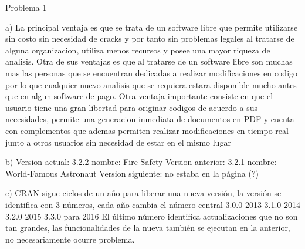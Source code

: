 \documentclass{article}
\begin{document}


Problema 1

a) La principal ventaja es que se trata de un software libre que permite utilizarse sin costo sin necesidad de cracks y por tanto sin problemas legales al tratarse de alguna organizacion, utiliza menos recursos y posee una mayor riqueza de analisis. Otra de sus ventajas es que al tratarse de un software libre son muchas mas las  personas que se encuentran dedicadas a realizar modificaciones en codigo por lo que cualquier nuevo analisis que se requiera estara disponible mucho antes que en algun software de pago. Otra ventaja importante consiste en que el usuario tiene una gran libertad para originar codigos de acuerdo a sus necesidades, permite una generacion inmediata de documentos en PDF y cuenta con complementos que ademas permiten realizar modificaciones en tiempo real junto a otros usuarios sin necesidad de estar en el mismo lugar

b) Version actual: 3.2.2 nombre: Fire Safety  
Version anterior: 3.2.1  nombre:  World-Famous Astronaut
Version siguiente: no estaba en la página (?)

c) CRAN sigue ciclos de un año para liberar una nueva versión, la versión se identifica con 3 números, cada año cambia el número central
3.0.0 2013
3.1.0 2014
3.2.0 2015
3.3.0 para 2016
El último número identifica actualizaciones que no son tan grandes, las funcionalidades de la nueva también se ejecutan en la anterior, no necesariamente ocurre problema.
\end{document}
